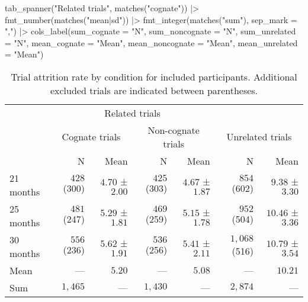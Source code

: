 \documentclass[
  letterpaper,
  DIV=11,
  numbers=noendperiod]{scrartcl}
\newenvironment{Shaded}{\begin{snugshade}}{\end{snugshade}}
\newcommand{\AttributeTok}[1]{\textcolor[rgb]{0.40,0.45,0.13}{#1}}
\newcommand{\FunctionTok}[1]{\textcolor[rgb]{0.28,0.35,0.67}{#1}}
\newcommand{\NormalTok}[1]{\textcolor[rgb]{0.00,0.23,0.31}{#1}}
\newcommand{\SpecialCharTok}[1]{\textcolor[rgb]{0.37,0.37,0.37}{#1}}
\newcommand{\StringTok}[1]{\textcolor[rgb]{0.13,0.47,0.30}{#1}}
\begin{document}
\begin{Shaded}
\begin{Highlighting}[]
    \FunctionTok{tab\_spanner}\NormalTok{(}\StringTok{"Related trials"}\NormalTok{, }\FunctionTok{matches}\NormalTok{(}\StringTok{"cognate"}\NormalTok{)) }\SpecialCharTok{|\textgreater{}}
    \FunctionTok{fmt\_number}\NormalTok{(}\FunctionTok{matches}\NormalTok{(}\StringTok{"mean|sd"}\NormalTok{)) }\SpecialCharTok{|\textgreater{}} 
    \FunctionTok{fmt\_integer}\NormalTok{(}\FunctionTok{matches}\NormalTok{(}\StringTok{"sum"}\NormalTok{), }\AttributeTok{sep\_mark =} \StringTok{","}\NormalTok{) }\SpecialCharTok{|\textgreater{}} 
    \FunctionTok{cols\_label}\NormalTok{(}\AttributeTok{sum\_cognate =} \StringTok{"N"}\NormalTok{,}
               \AttributeTok{sum\_noncognate =} \StringTok{"N"}\NormalTok{,}
               \AttributeTok{sum\_unrelated =} \StringTok{"N"}\NormalTok{,}
               \AttributeTok{mean\_cognate =} \StringTok{"Mean"}\NormalTok{,}
               \AttributeTok{mean\_noncognate =} \StringTok{"Mean"}\NormalTok{,}
               \AttributeTok{mean\_unrelated =} \StringTok{"Mean"}\NormalTok{)}
\end{Highlighting}
\end{Shaded}

\hypertarget{tbl-attrition-trials-vnone}{}
\begin{longtable}{l|rrrrrr}
\caption{\label{tbl-attrition-trials-vnone}Trial attrition rate by condition for included participants. Additional
excluded trials are indicated between parentheses. }\tabularnewline

\toprule
\multicolumn{1}{l}{} & \multicolumn{4}{c}{Related trials} &  &  \\ 
\cmidrule(lr){2-5}
\multicolumn{1}{l}{} & \multicolumn{2}{c}{Cognate trials} & \multicolumn{2}{c}{Non-cognate trials} & \multicolumn{2}{c}{Unrelated trials} \\ 
\cmidrule(lr){2-3} \cmidrule(lr){4-5} \cmidrule(lr){6-7}
\multicolumn{1}{l}{} & N & Mean & N & Mean & N & Mean \\ 
\midrule
21 months & $428$ (300) & $4.70$ ± $2.00$ & $425$ (303) & $4.67$ ± $1.87$ & $854$ (602) & $9.38$ ± $3.30$ \\ 
25 months & $481$ (247) & $5.29$ ± $1.81$ & $469$ (259) & $5.15$ ± $1.78$ & $952$ (504) & $10.46$ ± $3.36$ \\ 
30 months & $556$ (236) & $5.62$ ± $1.91$ & $536$ (256) & $5.41$ ± $2.11$ & $1,068$ (516) & $10.79$ ± $3.54$ \\ 
\midrule 
\midrule 
Mean & — & $5.20$ & — & $5.08$ & — & $10.21$ \\ 
Sum & $1,465$ & — & $1,430$ & — & $2,874$ & — \\ 
\bottomrule
\end{longtable}
\end{document}
